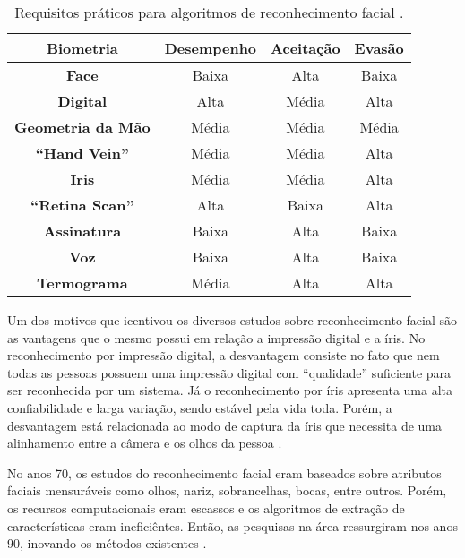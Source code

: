 	\begin{table}[htbp]
		\begin{center}
			\begin{tabular}{|c|c|c|c|}
				\hline \bf Biometria & \bf Desempenho & \bf Aceitação & \bf Evasão \\
				\hline \hline \bf Face & Baixa & Alta & Baixa\\
				\hline \bf Digital & Alta & Média &  Alta\\
				\hline \bf Geometria da Mão & Média & Média & Média\\
				\hline \bf ``Hand Vein'' & Média & Média & Alta\\
				\hline \bf Iris  & Média & Média & Alta\\
				\hline \bf ``Retina Scan'' & Alta & Baixa & Alta\\
				\hline \bf Assinatura & Baixa & Alta & Baixa \\
				\hline \bf Voz & Baixa & Alta & Baixa \\
				\hline \bf Termograma & Média & Alta & Alta \\
				\hline
			\end{tabular}
		\end{center}
		\caption{Requisitos práticos para algoritmos de reconhecimento facial \cite{milene}.}
		\label{tabelaRequisitosPraticos}
	\end{table}

Um dos motivos que icentivou os diversos estudos sobre reconhecimento facial são as vantagens que o mesmo possui em relação a impressão digital e a íris.  No reconhecimento por impressão digital, a desvantagem consiste no fato que nem todas as pessoas possuem uma impressão digital com ``qualidade'' suficiente para ser reconhecida por um sistema. Já o reconhecimento por íris apresenta uma alta confiabilidade e larga variação, sendo estável pela vida toda. Porém, a desvantagem está relacionada ao modo de captura da íris que necessita de uma alinhamento entre a câmera e os olhos da pessoa \cite{saocarlos}.

No anos 70, os estudos do reconhecimento facial eram baseados sobre atributos faciais mensuráveis como olhos, nariz, sobrancelhas, bocas, entre outros. Porém, os recursos computacionais eram escassos e os algoritmos de extração de características eram ineficiêntes. Então, as pesquisas na área ressurgiram nos anos 90, inovando os métodos existentes \cite{hong}\cite{saocarlos}.

